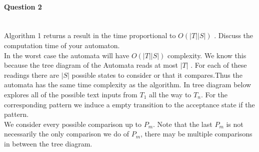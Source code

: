 \documentclass{report}
\newcommand{\me}[1]{
\begin{math}
#1
\end{math}
}
\begin{document}
\paragraph{\Large{Question 2\\ \\}}
Algorithm 1 returns a result in the time proportional to \me{O(|T| |S|)}. Discuss the computation time of your automaton.\newline
\\ In the worst case the automata will have \me{O(|T| |S|)} complexity. We know this because the tree diagram of the Automata reads at most \me{|T|}. For each of these readings there are \me{|S|} possible states to consider or that it compares.Thus the automata has the same time complexity as the algorithm. 
\newline \newline
In tree diagram below explores all of the possible text inputs from {$T_1$} all the way to {$T_n$}. For the corresponding pattern we induce a empty transition to the acceptance state if the pattern. \\ We consider every possible comparison up to $P_m$. Note that the last $P_m$ is not necessarily the only comparison we do of $P_m$, there may be multiple comparisons in between the tree diagram. \\



\end{document}
